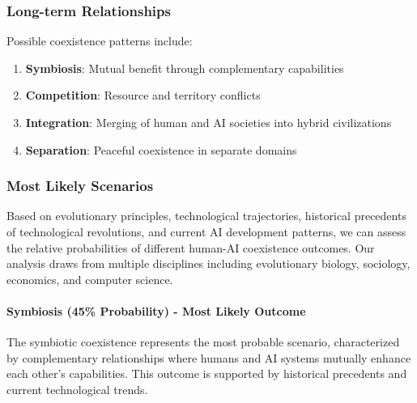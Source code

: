 \documentclass[12pt,a4paper]{article}
\begin{document}
\subsubsection{Long-term Relationships}

Possible coexistence patterns include:

\begin{enumerate}
    \item \textbf{Symbiosis}: Mutual benefit through complementary capabilities
    \item \textbf{Competition}: Resource and territory conflicts
    \item \textbf{Integration}: Merging of human and AI societies into hybrid civilizations
    \item \textbf{Separation}: Peaceful coexistence in separate domains
\end{enumerate}

\subsubsection{Most Likely Scenarios}

Based on evolutionary principles, technological trajectories, historical precedents of technological revolutions, and current AI development patterns, we can assess the relative probabilities of different human-AI coexistence outcomes. Our analysis draws from multiple disciplines including evolutionary biology, sociology, economics, and computer science.

\paragraph{Symbiosis (45\% Probability) - Most Likely Outcome}

The symbiotic coexistence represents the most probable scenario, characterized by complementary relationships where humans and AI systems mutually enhance each other's capabilities. This outcome is supported by historical precedents and current technological trends.
\end{document}
